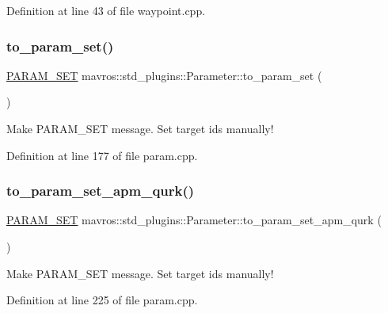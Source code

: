 Definition at line 43 of file waypoint.\+cpp.

\mbox{\label{group__plugin_ga4b2fdb771fa5acf1f2ec5224636f603f}} 
\subsubsection{\texorpdfstring{to\_param\_set()}{to\_param\_set()}}
{\footnotesize\ttfamily \mbox{\hyperlink{group__plugin_gaa94f933e0249802ee1985cb650408c31}{P\+A\+R\+A\+M\+\_\+\+S\+ET}} mavros\+::std\+\_\+plugins\+::\+Parameter\+::to\+\_\+param\+\_\+set (\begin{DoxyParamCaption}{ }\end{DoxyParamCaption})\hspace{0.3cm}{\ttfamily [inline]}}



Make P\+A\+R\+A\+M\+\_\+\+S\+ET message. Set target ids manually! 



Definition at line 177 of file param.\+cpp.

\mbox{\label{group__plugin_gac1ad9cfef5618f54cf828438bb98cb03}} 
\subsubsection{\texorpdfstring{to\_param\_set\_apm\_qurk()}{to\_param\_set\_apm\_qurk()}}
{\footnotesize\ttfamily \mbox{\hyperlink{group__plugin_gaa94f933e0249802ee1985cb650408c31}{P\+A\+R\+A\+M\+\_\+\+S\+ET}} mavros\+::std\+\_\+plugins\+::\+Parameter\+::to\+\_\+param\+\_\+set\+\_\+apm\+\_\+qurk (\begin{DoxyParamCaption}{ }\end{DoxyParamCaption})\hspace{0.3cm}{\ttfamily [inline]}}



Make P\+A\+R\+A\+M\+\_\+\+S\+ET message. Set target ids manually! 



Definition at line 225 of file param.\+cpp.

\mbox{\label{group__plugin_ga687f8cff04b669b9d15aacd19ec0af23}} 
